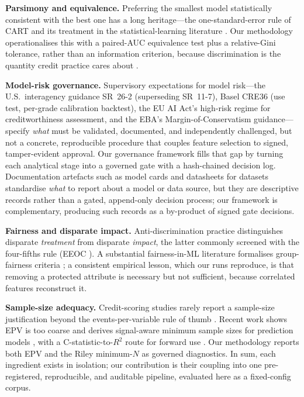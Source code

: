 \documentclass[9pt,journal]{IEEEtai}
\begin{document}
\textbf{Parsimony and equivalence.} Preferring the smallest model statistically consistent with
the best one has a long heritage---the one-standard-error rule of CART \cite{breiman1984cart}
and its treatment in the statistical-learning literature \cite{hastie2009}. Our methodology operationalises
this with a paired-AUC equivalence test \cite{delong1988} plus a relative-Gini tolerance, rather
than an information criterion, because discrimination is the quantity credit practice cares about
\cite{lessmann2015,siddiqi2006}.

\textbf{Model-risk governance.} Supervisory expectations for model risk---the U.S.\ interagency
guidance SR~26-2 \cite{sr26_2} (superseding SR~11-7), Basel CRE36 \cite{bcbs_cre} (use test,
per-grade calibration backtest), the EU AI Act's \cite{euaiact2024} high-risk regime for
creditworthiness assessment, and the EBA's Margin-of-Conservatism guidance---specify \emph{what}
must be validated, documented, and independently
challenged, but not a concrete, reproducible procedure that couples feature selection to signed,
tamper-evident approval. Our governance framework fills that gap by turning each analytical stage into a governed
gate with a hash-chained decision log. Documentation artefacts such as model cards
\cite{mitchell2019modelcards} and datasheets for datasets \cite{gebru2021datasheets} standardise
\emph{what} to report about a model or data source, but they are descriptive records rather than a
gated, append-only decision process; our framework is complementary, producing such records as a
by-product of signed gate decisions.

\textbf{Fairness and disparate impact.} Anti-discrimination practice distinguishes disparate
\emph{treatment} from disparate \emph{impact}, the latter commonly screened with the four-fifths
rule (EEOC \cite{eeoc1978}). A substantial fairness-in-ML literature formalises group-fairness criteria
\cite{hardt2016eoo}; a consistent empirical lesson, which our runs reproduce, is that removing a
protected attribute is necessary but not sufficient, because correlated features reconstruct it.

\textbf{Sample-size adequacy.} Credit-scoring studies rarely report a sample-size justification
beyond the events-per-variable rule of thumb \cite{peduzzi1996}. Recent work shows EPV is too
coarse \cite{vansmeden2019} and derives signal-aware minimum sample sizes for prediction models
\cite{riley2019sim,riley2020bmj}, with a C-statistic-to-$R^2$ route for forward use
\cite{rileyvancalster2020}. Our methodology reports both EPV and the Riley minimum-$N$ as governed
diagnostics. In sum, each ingredient exists in isolation; our contribution is their coupling
into one pre-registered, reproducible, and auditable pipeline, evaluated here as a fixed-config
corpus.
\end{document}
